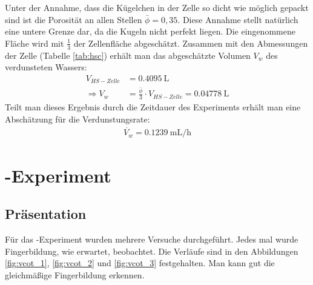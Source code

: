 Unter der Annahme, dass die Kügelchen in der Zelle so dicht wie möglich gepackt sind ist die Porosität an allen Stellen $\bar{\phi} = 0,35$. Diese Annahme stellt natürlich eine untere Grenze dar, da die Kugeln nicht perfekt liegen. 
Die eingenommene Fläche wird mit $\frac{1}{3}$ der Zellenfläche abgeschätzt. Zusammen mit den Abmessungen der Zelle (Tabelle \ref{tab:hsc}) erhält man das abgeschätzte Volumen $V_w$ des verdunsteten Wassers:
\begin{align}
 V_{HS-Zelle} &=  \SI{0,4095}{\liter} \\
 \Rightarrow V_{w} &= \frac{\bar{\phi}}{3} \cdot V_{HS-Zelle} = \SI{0,04778}{\liter}
\end{align}
Teilt man dieses Ergebnis durch die Zeitdauer des Experiments erhält man eine Abschätzung für die Verdunstungsrate:
\begin{align}
 \dot{V_w} = \SI{0.1239}{\milli\liter\per\hour}
\end{align}





\section{\COT-Experiment}
\label{res:cot}

\subsection{Präsentation}
\label{res:cot:pres}


Für das \COT-Experiment wurden mehrere Versuche durchgeführt. Jedes mal wurde Fingerbildung, wie erwartet, beobachtet. Die Verläufe sind in den Abbildungen \ref{fig:vcot_1}, \ref{fig:vcot_2} und \ref{fig:vcot_3} festgehalten. Man kann gut die gleichmäßige Fingerbildung erkennen.

\newpage
\begin{landscape}
 

\end{landscape}

